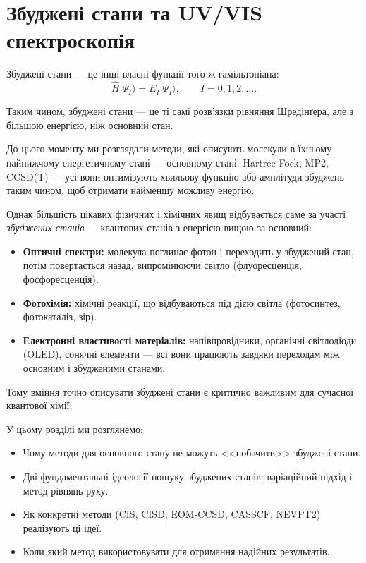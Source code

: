 
\chapter{Збуджені стани та UV/VIS спектроскопія}

Збуджені стани --- це інші власні функції того ж гамільтоніана:
\[
    \hat{H} |\Psi_I\rangle = E_I |\Psi_I\rangle, \qquad I = 0, 1, 2, \dots.
\]

Таким чином, збуджені стани --- це ті самі розв'язки рівняння Шредінґера, але з більшою енергією, ніж основний стан.

До цього моменту ми розглядали методи, які описують молекули в їхньому найнижчому енергетичному стані ---
основному стані. Hartree-Fock, MP2, CCSD(T) --- усі вони оптимізують хвильову функцію
або амплітуди збуджень таким чином, щоб отримати найменшу можливу енергію.

Однак більшість цікавих фізичних і хімічних явищ відбувається саме за участі \emph{збуджених станів} ---
квантових станів з енергією вищою за основний:
\begin{itemize}
    \item \textbf{Оптичні спектри:} молекула поглинає фотон і переходить у збуджений стан,
          потім повертається назад, випромінюючи світло (флуоресценція, фосфоресценція).
    \item \textbf{Фотохімія:} хімічні реакції, що відбуваються під дією світла
          (фотосинтез, фотокаталіз, зір).
    \item \textbf{Електронні властивості матеріалів:} напівпровідники, органічні світлодіоди (OLED),
          сонячні елементи --- всі вони працюють завдяки переходам між основним і збудженими станами.
\end{itemize}

Тому вміння точно описувати збуджені стани є критично важливим для сучасної квантової хімії.

У цьому розділі ми розглянемо:
\begin{itemize}
    \item Чому методи для основного стану не можуть <<побачити>> збуджені стани.
    \item Дві фундаментальні ідеології пошуку збуджених станів:
          варіаційний підхід і метод рівнянь руху.
    \item Як конкретні методи (CIS, CISD, EOM-CCSD, CASSCF, NEVPT2) реалізують ці ідеї.
    \item Коли який метод використовувати для отримання надійних результатів.
\end{itemize}


